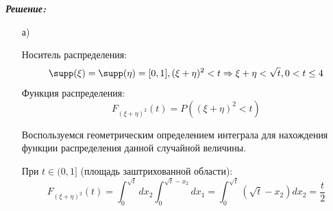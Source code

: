 \noindent\textit{\textbf{Решение:}}

\begin{enumerate}
	\item[а)]
	
	Носитель распределения:
	\[ \supp (\xi) = \supp (\eta) = [0,1], (\xi + \eta)^2 < t \Rightarrow \xi + \eta < \sqrt{t}, 0 < t \le 4 \]
	Функция распределения:
	\[ F_{(\xi + \eta)^2} (t) = P( (\xi + \eta)^2 < t ) \]
	\begin{figure}[H]
	\end{figure}
	
	Воспользуемся геометрическим определением интеграла для нахождения функции распределения данной случайной величины.
	
	При $t \in (0, 1]$ (площадь заштрихованной области):
	\[ F_{(\xi + \eta)^2} (t) = \int_{0}^{\sqrt{t}} dx_2 \int_{0}^{\sqrt{t} - x_2} dx_1 = \int_{0}^{\sqrt{t}} (\sqrt{t} - x_2) dx_2 = \frac{t}{2} \]
	

\end{enumerate}
